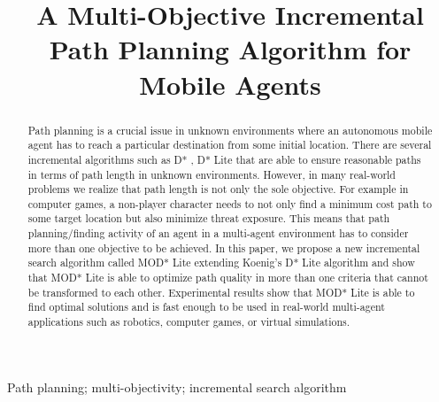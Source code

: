 \documentclass[10pt, a4paper, conference, compsocconf]{IEEEtran}
\begin{document}
\title{A Multi-Objective Incremental Path Planning Algorithm for Mobile Agents}

\author{
\and
{}
}

\maketitle

\begin{abstract}
Path planning is a crucial issue in unknown environments where an autonomous mobile agent has to reach a particular destination from some initial location. There are several incremental algorithms such as D* \cite{DStar:1994}, D* Lite \cite{Koenig:2002} that are able to ensure reasonable paths in terms of path length in unknown environments. However, in many real-world problems we realize that path length is not only the sole objective. For example in computer games, a non-player character needs to not only find a minimum cost path to some target location but also minimize threat exposure. This means that path planning/finding activity of an agent in a multi-agent environment has to consider more than one objective to be achieved. In this paper, we propose a new incremental search algorithm called MOD* Lite extending Koenig's D* Lite algorithm and show that MOD* Lite is able to optimize path quality in more than one criteria that cannot be transformed to each other. Experimental results show that MOD* Lite is able to find optimal solutions and is fast enough to be used in real-world multi-agent applications such as robotics, computer games, or virtual simulations. 
\end{abstract}

\begin{IEEEkeywords}
Path planning; multi-objectivity; incremental search algorithm
\end{IEEEkeywords}
\end{document}

